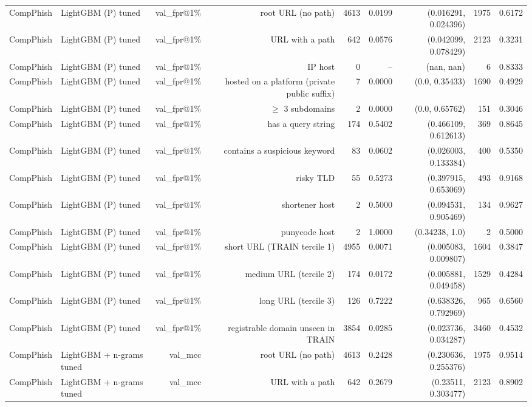 \begin{table}[t]
\begin{tabular}{llrrrrrrr}
CompPhish & LightGBM (P) tuned & val\_fpr@1\% & root URL (no path) & 4613 & 0.0199 & (0.016291, 0.024396) & 1975 & 0.6172 \\
CompPhish & LightGBM (P) tuned & val\_fpr@1\% & URL with a path & 642 & 0.0576 & (0.042099, 0.078429) & 2123 & 0.3231 \\
CompPhish & LightGBM (P) tuned & val\_fpr@1\% & IP host & 0 & -- & (nan, nan) & 6 & 0.8333 \\
CompPhish & LightGBM (P) tuned & val\_fpr@1\% & hosted on a platform (private public suffix) & 7 & 0.0000 & (0.0, 0.35433) & 1690 & 0.4929 \\
CompPhish & LightGBM (P) tuned & val\_fpr@1\% & $\geq$ 3 subdomains & 2 & 0.0000 & (0.0, 0.65762) & 151 & 0.3046 \\
CompPhish & LightGBM (P) tuned & val\_fpr@1\% & has a query string & 174 & 0.5402 & (0.466109, 0.612613) & 369 & 0.8645 \\
CompPhish & LightGBM (P) tuned & val\_fpr@1\% & contains a suspicious keyword & 83 & 0.0602 & (0.026003, 0.133384) & 400 & 0.5350 \\
CompPhish & LightGBM (P) tuned & val\_fpr@1\% & risky TLD & 55 & 0.5273 & (0.397915, 0.653069) & 493 & 0.9168 \\
CompPhish & LightGBM (P) tuned & val\_fpr@1\% & shortener host & 2 & 0.5000 & (0.094531, 0.905469) & 134 & 0.9627 \\
CompPhish & LightGBM (P) tuned & val\_fpr@1\% & punycode host & 2 & 1.0000 & (0.34238, 1.0) & 2 & 0.5000 \\
CompPhish & LightGBM (P) tuned & val\_fpr@1\% & short URL (TRAIN tercile 1) & 4955 & 0.0071 & (0.005083, 0.009807) & 1604 & 0.3847 \\
CompPhish & LightGBM (P) tuned & val\_fpr@1\% & medium URL (tercile 2) & 174 & 0.0172 & (0.005881, 0.049458) & 1529 & 0.4284 \\
CompPhish & LightGBM (P) tuned & val\_fpr@1\% & long URL (tercile 3) & 126 & 0.7222 & (0.638326, 0.792969) & 965 & 0.6560 \\
CompPhish & LightGBM (P) tuned & val\_fpr@1\% & registrable domain unseen in TRAIN & 3854 & 0.0285 & (0.023736, 0.034287) & 3460 & 0.4532 \\
CompPhish & LightGBM + n-grams tuned & val\_mcc & root URL (no path) & 4613 & 0.2428 & (0.230636, 0.255376) & 1975 & 0.9514 \\
CompPhish & LightGBM + n-grams tuned & val\_mcc & URL with a path & 642 & 0.2679 & (0.23511, 0.303477) & 2123 & 0.8902 \\

\end{tabular}
\end{table}
